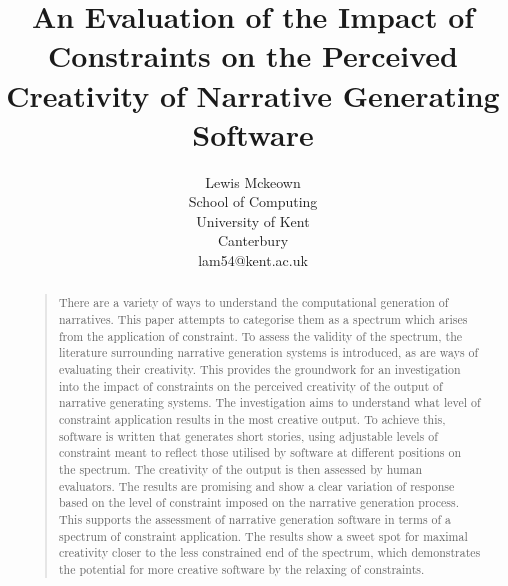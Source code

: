 \documentclass[letterpaper]{article}
\title{An Evaluation of the Impact of Constraints on the Perceived Creativity of Narrative Generating Software}
\author{Lewis Mckeown\\
School of Computing\\
University of Kent\\
Canterbury\\
lam54@kent.ac.uk\\
}
\begin{document}
 
\maketitle
\begin{abstract}
\begin{quote}
There are a variety of ways to understand the computational generation of narratives. This paper attempts to categorise them as a spectrum which arises from the application of constraint. To assess the validity of the spectrum, the literature surrounding narrative generation systems is introduced, as are ways of evaluating their creativity. This provides the groundwork for an investigation into the impact of constraints on the perceived creativity of the output of narrative generating systems. The investigation aims to understand what level of constraint application results in the most creative output. To achieve this, software is written that generates short stories, using adjustable levels of constraint meant to reflect those utilised by software at different positions on the spectrum. The creativity of the output is then assessed by human evaluators. The results are promising and show a clear variation of response based on the level of constraint imposed on the narrative generation process. This supports the assessment of narrative generation software in terms of a spectrum of constraint application. The results show a sweet spot for maximal creativity closer to the less constrained end of the spectrum, which demonstrates the potential for more creative software by the relaxing of constraints. \end{quote}
\end{abstract}

\end{document}
